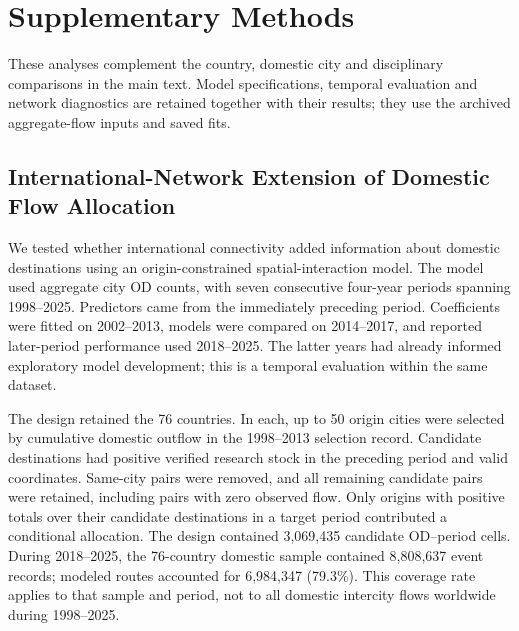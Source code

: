 \clearpage
\section*{Supplementary Methods}
\begingroup
\renewcommand{\thesubsection}{S\arabic{subsection}}
\setcounter{subsection}{0}

These analyses complement the country, domestic city and disciplinary comparisons in the main text. Model specifications, temporal evaluation and network diagnostics are retained together with their results; they use the archived aggregate-flow inputs and saved fits.

\subsection{International-Network Extension of Domestic Flow Allocation}
\label{supp:network_methods}

We tested whether international connectivity added information about domestic destinations using an origin-constrained spatial-interaction model\cite{lenormand2016}. The model used aggregate city OD counts, with seven consecutive four-year periods spanning 1998--2025. Predictors came from the immediately preceding period. Coefficients were fitted on 2002--2013, models were compared on 2014--2017, and reported later-period performance used 2018--2025. The latter years had already informed exploratory model development; this is a temporal evaluation within the same dataset.

The design retained the 76 countries. In each, up to 50 origin cities were selected by cumulative domestic outflow in the 1998--2013 selection record. Candidate destinations had positive verified research stock in the preceding period and valid coordinates. Same-city pairs were removed, and all remaining candidate pairs were retained, including pairs with zero observed flow. Only origins with positive totals over their candidate destinations in a target period contributed a conditional allocation. The design contained 3,069,435 candidate OD--period cells. During 2018--2025, the 76-country domestic sample contained 8,808,637 event records; modeled routes accounted for 6,984,347 (79.3\%). This coverage rate applies to that sample and period, not to all domestic intercity flows worldwide during 1998--2025.


